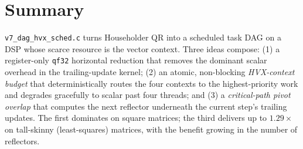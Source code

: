 \documentclass[11pt]{article}
\newcommand{\code}[1]{\texttt{\small #1}}
\newcommand{\file}[1]{\textcolor{hvxblue}{\texttt{#1}}}
\begin{document}
\section{Summary}
\file{v7\_dag\_hvx\_sched.c} turns Householder QR into a scheduled task DAG on a DSP
whose scarce resource is the vector context. Three ideas compose:
(1) a register-only \code{qf32} horizontal reduction that removes the dominant scalar
overhead in the trailing-update kernel; (2) an atomic, non-blocking
\emph{HVX-context budget} that deterministically routes the four contexts to the
highest-priority work and degrades gracefully to scalar past four threads; and
(3) a \emph{critical-path pivot overlap} that computes the next reflector underneath the
current step's trailing updates. The first dominates on square matrices; the third
delivers up to $1.29\times$ on tall-skinny (least-squares) matrices, with the benefit
growing in the number of reflectors.
\end{document}
